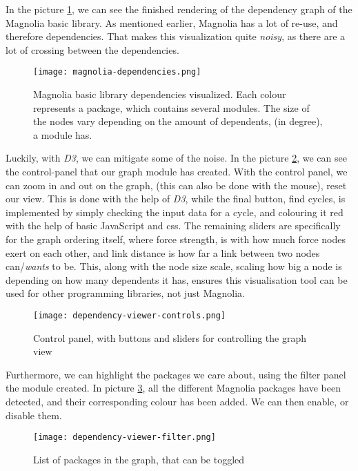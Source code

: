 In the picture \ref{pic:magLib}, we can see the finished rendering of the
dependency graph of the Magnolia basic library. As mentioned earlier, Magnolia
has a lot of re-use, and therefore dependencies. That makes this visualization
quite \textit{noisy}, as there are a lot of crossing between the dependencies.

\begin{figure}[H]
  \centering
  \texttt{[image: magnolia-dependencies.png]}
  \caption{
    Magnolia basic library dependencies visualized. Each colour represents a
    package, which contains several modules. The size of the nodes vary
    depending on the amount of dependents, (in degree), a module has.
  }
  \label{pic:magLib}
\end{figure}

Luckily, with \textit{D3}, we can mitigate some of the noise. In the picture
\ref{pic:depCont}, we can see the control-panel that our graph module has
created. With the control panel, we can zoom in and out on the graph,
(this can also be done with the mouse), reset our view. This is done with the
help of \textit{D3}, while the final button, find cycles, is implemented by
simply checking the input data for a cycle, and colouring it red with the help
of basic JavaScript and \gls{css}. The remaining sliders are specifically for
the graph ordering itself, where force strength, is with how much force nodes
exert on each other, and link distance is how far a link between two nodes
can/\textit{wants} to be. This, along with the node size scale, scaling how big
a node is depending on how many dependents it has, ensures this visualisation
tool can be used for other programming libraries, not just Magnolia.

\begin{figure}
  \centering
  \texttt{[image: dependency-viewer-controls.png]}
  \caption{
    Control panel, with buttons and sliders for controlling the graph view
  }
  \label{pic:depCont}
\end{figure}

Furthermore, we can highlight the packages we care about, using the filter
panel the module created. In picture \ref{pic:depFil}, all the different
Magnolia packages have been detected, and their corresponding colour has been
added. We can then enable, or disable them.

\begin{figure}
  \centering
  \texttt{[image: dependency-viewer-filter.png]}
  \caption{List of packages in the graph, that can be toggled}
  \label{pic:depFil}
\end{figure}

